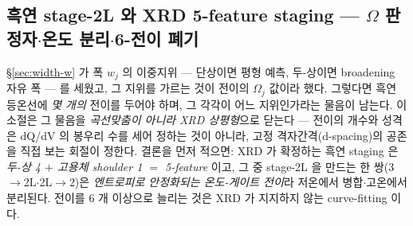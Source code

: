 \subsection{흑연 stage-2L 와 XRD 5-feature staging --- $\Omega$ 판정자$\cdot$온도 분리$\cdot$6-전이 폐기}\label{ssec:gr-stage2L}
\S\ref{sec:width-w} 가 폭 $w_j$ 의 이중지위 --- 단상이면 평형 예측, 두-상이면 broadening 자유 폭 --- 를 세웠고,
그 지위를 가르는 것이 전이의 $\Omega_j$ 값이라 했다. 그렇다면 흑연 등온선에 \emph{몇 개의} 전이를 두어야 하며,
그 각각이 어느 지위인가라는 물음이 남는다. 이 소절은 그 물음을 \emph{곡선맞춤이 아니라 XRD 상평형}으로
닫는다 --- 전이의 개수와 성격은 dQ/dV 의 봉우리 수를 세어 정하는 것이 아니라, 고정 격자간격(d-spacing)의
공존을 직접 보는 회절이 정한다. 결론을 먼저 적으면: XRD 가 확정하는 흑연 staging 은 \emph{두-상 4 $+$ 고용체
shoulder 1 $=$ 5-feature} 이고, 그 중 stage-2L 을 만드는 한 쌍(3$\to$2L$\cdot$2L$\to$2)은 \emph{엔트로피로
안정화되는 온도-게이트 전이}라 저온에서 병합$\cdot$고온에서 분리된다. 전이를 6 개 이상으로 늘리는 것은 XRD 가
지지하지 않는 curve-fitting 이다.

